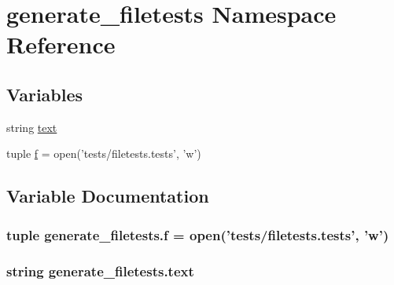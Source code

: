 \hypertarget{namespacegenerate__filetests}{\section{generate\-\_\-filetests Namespace Reference}
\label{namespacegenerate__filetests}
}
\subsection*{Variables}
\begin{DoxyCompactItemize}
\item 
string \hyperlink{namespacegenerate__filetests_ac0919571eb1d80df2a86c1f3481dead7}{text}
\item 
tuple \hyperlink{namespacegenerate__filetests_a3b6acc5bb114474ac72cd02baf9443ee}{f} = open('tests/filetests.\-tests', 'w')
\end{DoxyCompactItemize}


\subsection{Variable Documentation}
\hypertarget{namespacegenerate__filetests_a3b6acc5bb114474ac72cd02baf9443ee}{
\subsubsection[{f}]{\setlength{\rightskip}{0pt plus 5cm}tuple generate\-\_\-filetests.\-f = open('tests/filetests.\-tests', 'w')}}\label{namespacegenerate__filetests_a3b6acc5bb114474ac72cd02baf9443ee}
\hypertarget{namespacegenerate__filetests_ac0919571eb1d80df2a86c1f3481dead7}{
\subsubsection[{text}]{\setlength{\rightskip}{0pt plus 5cm}string generate\-\_\-filetests.\-text}}\label{namespacegenerate__filetests_ac0919571eb1d80df2a86c1f3481dead7}
